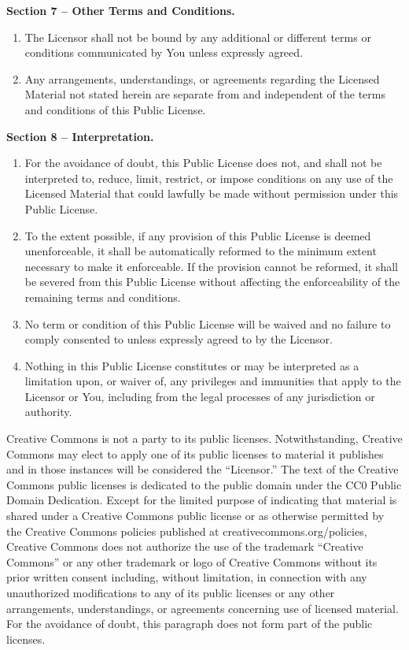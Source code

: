 \par \textbf{Section 7 – Other Terms and Conditions.}
\begin{enumerate}
\item The Licensor shall not be bound by any additional or different terms or conditions communicated by You unless expressly agreed.
\item Any arrangements, understandings, or agreements regarding the Licensed Material not stated herein are separate from and independent of the terms and conditions of this Public License.
\end{enumerate}
\par \textbf{Section 8 – Interpretation.}
\begin{enumerate}
\item For the avoidance of doubt, this Public License does not, and shall not be interpreted to, reduce, limit, restrict, or impose conditions on any use of the Licensed Material that could lawfully be made without permission under this Public License.
\item To the extent possible, if any provision of this Public License is deemed unenforceable, it shall be automatically reformed to the minimum extent necessary to make it enforceable. If the provision cannot be reformed, it shall be severed from this Public License without affecting the enforceability of the remaining terms and conditions.
\item No term or condition of this Public License will be waived and no failure to comply consented to unless expressly agreed to by the Licensor.
\item Nothing in this Public License constitutes or may be interpreted as a limitation upon, or waiver of, any privileges and immunities that apply to the Licensor or You, including from the legal processes of any jurisdiction or authority.
\end{enumerate}
\par Creative Commons is not a party to its public licenses. Notwithstanding, Creative Commons may elect to apply one of its public licenses to material it publishes and in those instances will be considered the “Licensor.” The text of the Creative Commons public licenses is dedicated to the public domain under the CC0 Public Domain Dedication. Except for the limited purpose of indicating that material is shared under a Creative Commons public license or as otherwise permitted by the Creative Commons policies published at creativecommons.org/policies, Creative Commons does not authorize the use of the trademark “Creative Commons” or any other trademark or logo of Creative Commons without its prior written consent including, without limitation, in connection with any unauthorized modifications to any of its public licenses or any other arrangements, understandings, or agreements concerning use of licensed material. For the avoidance of doubt, this paragraph does not form part of the public licenses.\\\\
